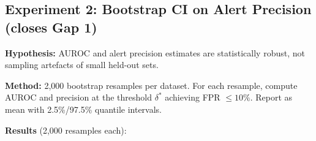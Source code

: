 \documentclass[11pt,a4paper]{article}
\begin{document}
\begin{table}[h]
\centering\small
{}
\caption{Baseline comparison across 1,800 chains (five domains).
SC\_OLD beats Random on all domains. SC\_OLD and StepCount are competitive
on TriviaQA ($\Delta = 0.011$), but SC\_OLD dominates on multi-hop domains
(2Wiki, MuSiQue, NQ) where step count carries less signal.
MiniJudge leads on short-chain HotpotQA where behavioral features
have insufficient signal. Bottom row shows SC\_OLD on the original
research-agent chains that produced the 0.817 figure.}
\label{tab:baselines}
\end{table}

\subsection{Experiment 2: Bootstrap CI on Alert Precision (closes Gap 1)}

\textbf{Hypothesis:} AUROC and alert precision estimates are statistically
robust, not sampling artefacts of small held-out sets.

\textbf{Method:} 2,000 bootstrap resamples per dataset. For each resample,
compute AUROC and precision at the threshold $\delta^*$ achieving
FPR $\leq 10\%$. Report as mean with 2.5\%/97.5\% quantile intervals.

\textbf{Results} (2,000 resamples each):
\end{document}
